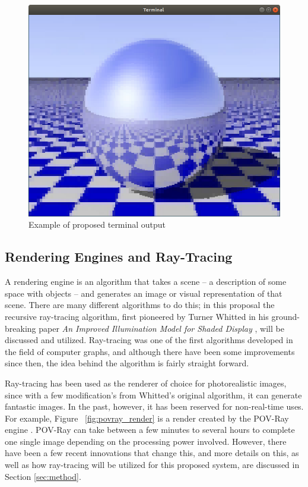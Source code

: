 \documentclass[11pt]{article}
\begin{document}
\begin{figure}[htb]
  \centering
  \includegraphics[width=\textwidth]{resources/checker_metal}
  \caption{Example of proposed terminal output}
  \label{fig:checker_metal}
\end{figure}

\subsection{Rendering Engines and Ray-Tracing}
\label{sec:introduction:raytracing}

A rendering engine is an algorithm that takes a scene -- a description of some space with objects -- and generates an image or visual representation of that scene.
There are many different algorithms to do this; in this proposal the recursive ray-tracing algorithm, first pioneered by Turner Whitted in his ground-breaking paper {\it An Improved Illumination Model for Shaded Display} \cite{whitted1980improved}, will be discussed and utilized.
Ray-tracing was one of the first algorithms developed in the field of computer graphs, and although there have been some improvements since then, the idea behind the algorithm is fairly straight forward.

Ray-tracing has been used as the renderer of choice for photorealistic images, since with a few modification's from Whitted's original algorithm, it can generate fantastic images.
In the past, however, it has been reserved for non-real-time uses.
For example, Figure ~\ref{fig:povray_render} is a render created by the POV-Ray engine \cite{povray}.
POV-Ray can take between a few minutes to several hours to complete one single image depending on the processing power involved.
However, there have been a few recent innovations that change this, and more details on this, as well as how ray-tracing will be utilized for this proposed system, are discussed in Section \ref{sec:method}.
\end{document}
